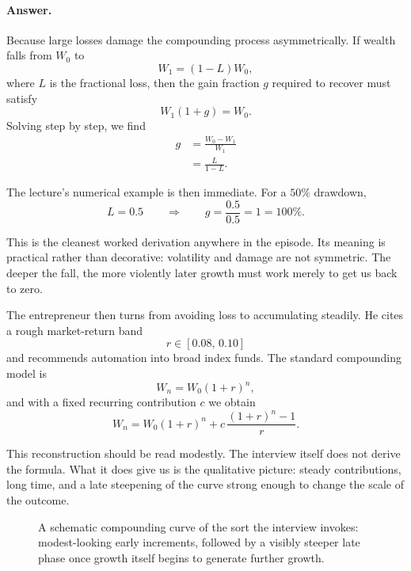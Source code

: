 \paragraph{Answer.} Because large losses damage the compounding process asymmetrically. If wealth falls from \(W_0\) to
\begin{equation}
W_1=(1-L)W_0,
\end{equation}
where \(L\) is the fractional loss, then the gain fraction \(g\) required to recover must satisfy
\begin{equation}
W_1(1+g)=W_0.
\end{equation}
Solving step by step, we find
\begin{align}
g &= \frac{W_0-W_1}{W_1}\\
  &= \frac{L}{1-L}.
\end{align}

The lecture's numerical example is then immediate. For a \(50\%\) drawdown,
\begin{equation}
L=0.5
\qquad \Longrightarrow \qquad
g=\frac{0.5}{0.5}=1=100\%.
\end{equation}

This is the cleanest worked derivation anywhere in the episode. Its meaning is practical rather than decorative: volatility and damage are not symmetric. The deeper the fall, the more violently later growth must work merely to get us back to zero.

The entrepreneur then turns from avoiding loss to accumulating steadily. He cites a rough market-return band
\begin{equation}
r \in [0.08,\,0.10]
\end{equation}
and recommends automation into broad index funds. The standard compounding model is
\begin{equation}
W_n=W_0(1+r)^n,
\end{equation}
and with a fixed recurring contribution \(c\) we obtain
\begin{equation}
W_n=W_0(1+r)^n + c\,\frac{(1+r)^n-1}{r}.
\end{equation}

This reconstruction should be read modestly. The interview itself does not derive the formula. What it does give us is the qualitative picture: steady contributions, long time, and a late steepening of the curve strong enough to change the scale of the outcome.

\begin{figure}[h]
\centering
{}

A schematic compounding curve of the sort the interview invokes: modest-looking early increments, followed by a visibly steeper late phase once growth itself begins to generate further growth.
\end{figure}

